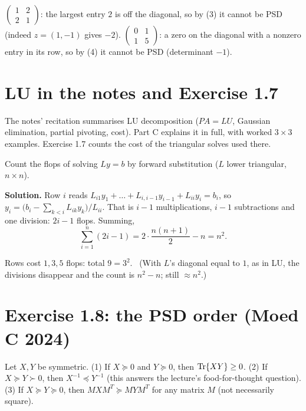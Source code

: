 \begin{example}
$\begin{pmatrix}1&2\\2&1\end{pmatrix}$: the largest entry $2$ is off the diagonal, so by (3) it cannot be PSD (indeed $z=(1,-1)$ gives $-2$).
$\begin{pmatrix}0&1\\1&5\end{pmatrix}$: a zero on the diagonal with a nonzero entry in its row, so by (4) it cannot be PSD (determinant $-1$).
\end{example}

\section{LU in the notes and Exercise 1.7}

The notes' recitation summarises LU decomposition ($PA=LU$, Gaussian elimination, partial pivoting, cost). Part C explains it in full,
with worked $3\times3$ examples. Exercise 1.7 counts the cost of the triangular solves used there.

\begin{example}
Count the flops of solving $Ly=b$ by forward substitution ($L$ lower triangular, $n\times n$).
\end{example}

\textbf{Solution.} Row $i$ reads $L_{i1}y_1+\dots+L_{i,i-1}y_{i-1}+L_{ii}y_i = b_i$, so
$y_i = \big(b_i - \sum_{k<i}L_{ik}y_k\big)/L_{ii}$. That is $i-1$ multiplications, $i-1$ subtractions and one division: $2i-1$ flops. Summing,
\[ \sum_{i=1}^n(2i-1) = 2\cdot\frac{n(n+1)}{2}-n = n^2. \]

\begin{example}[Check for $n=3$]
Rows cost $1,3,5$ flops: total $9=3^2$. \checkmark\ (With $L$'s diagonal equal to $1$, as in LU, the divisions disappear and the count is $n^2-n$; still $\approx n^2$.)
\end{example}

\section{Exercise 1.8: the PSD order (Moed C 2024)}

\begin{example}
Let $X,Y$ be symmetric.
(1) If $X\succeq0$ and $Y\succeq0$, then $\operatorname{Tr}\{XY\}\ge0$.
(2) If $X\succeq Y\succ0$, then $X^{-1}\preceq Y^{-1}$ (this answers the lecture's food-for-thought question).
(3) If $X\succeq Y\succeq0$, then $MXM^T\succeq MYM^T$ for any matrix $M$ (not necessarily square).
\end{example}

